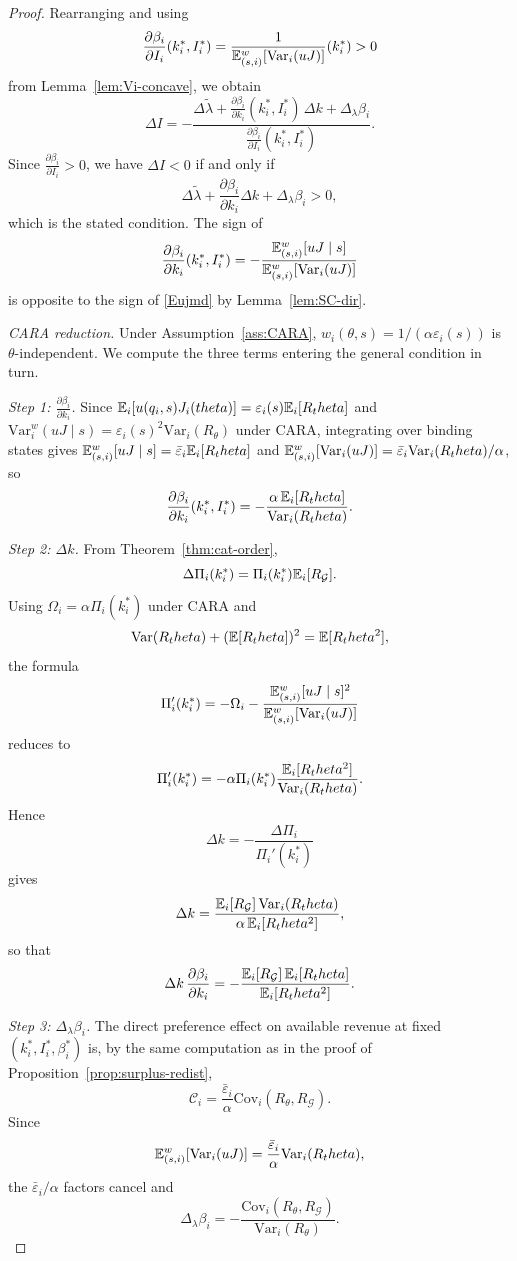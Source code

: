 \documentclass[master.tex]{subfiles}
\begin{document}
\begin{proof}
Rearranging and using
\[
\frac{\partial\beta_i}{\partial I_i}(k_i^\ast,I_i^\ast)
=
\frac{1}{\mathbb{E}_{(s,i)}^w[\mathrm{Var}_i(uJ)]}(k_i^\ast)>0
\]
from Lemma~\ref{lem:Vi-concave}, we obtain
\[
\Delta I
=
-\frac{
\Delta\tilde\lambda
+
\frac{\partial \beta_i}{\partial k_i}(k_i^\ast,I_i^\ast)\,\Delta k
+
\Delta_\lambda\beta_i
}{
\frac{\partial \beta_i}{\partial I_i}(k_i^\ast,I_i^\ast)
}.
\]
Since $\frac{\partial\beta_i}{\partial I_i}>0$, we have $\Delta I<0$ if and only if
\[
\Delta\tilde\lambda
+
\frac{\partial\beta_i}{\partial k_i}\Delta k
+
\Delta_\lambda\beta_i
>0,
\]
which is the stated condition. The sign of
\[
\frac{\partial\beta_i}{\partial k_i}(k_i^\ast,I_i^\ast)
=
-\frac{\mathbb{E}_{(s,i)}^w[uJ\mid s]}{\mathbb{E}_{(s,i)}^w[\mathrm{Var}_i(uJ)]}
\]
is opposite to the sign of \eqref{Eujmd} by Lemma~\ref{lem:SC-dir}.

\noindent\textit{CARA reduction.} Under Assumption~\ref{ass:CARA}, $w_i(\theta,s)=1/(\alpha\varepsilon_i(s))$ is $\theta$-independent. We compute the three terms entering the general condition in turn.

\noindent\textit{Step 1: $\frac{\partial\beta_i}{\partial k_i}$.} Since $\mathbb{E}_i[u(q_i,s)J_i(theta)]=\varepsilon_i(s)\mathbb{E}_i[R_theta]$ and $\mathrm{Var}_i^w(uJ\mid s)=\varepsilon_i(s)^2\mathrm{Var}_i(R_\theta)$ under CARA, integrating over binding states gives $\mathbb{E}_{(s,i)}^w[uJ\mid s]=\bar\varepsilon_i\mathbb{E}_i[R_theta]$ and $\mathbb{E}_{(s,i)}^w[\mathrm{Var}_i(uJ)]=\bar\varepsilon_i\mathrm{Var}_i(R_theta)/\alpha$, so
\[
\frac{\partial\beta_i}{\partial k_i}(k_i^\ast,I_i^\ast)
=
-\frac{\alpha\,\mathbb{E}_i[R_theta]}{\mathrm{Var}_i(R_theta)}.
\]

\noindent\textit{Step 2: $\Delta k$.} From Theorem~\ref{thm:cat-order},
\[
\Delta\Pi_i(k_i^\ast)=\Pi_i(k_i^\ast)\mathbb{E}_i[R_\mathcal{G}].
\]
Using $\Omega_i=\alpha\Pi_i(k_i^\ast)$ under CARA and
\[
\mathrm{Var}(R_theta)+(\mathbb{E}[R_theta])^2=\mathbb{E}[R_theta^2],
\]
the formula
\[
\Pi_i'(k_i^\ast)
=
-\Omega_i-\frac{\mathbb{E}_{(s,i)}^w[uJ\mid s]^2}{\mathbb{E}_{(s,i)}^w[\mathrm{Var}_i(uJ)]}
\]
reduces to
\[
\Pi_i'(k_i^\ast)
=
-\alpha\Pi_i(k_i^\ast)\frac{\mathbb{E}_i[R_theta^2]}{\mathrm{Var}_i(R_theta)}.
\]
Hence
\[
\Delta k = -\frac{\Delta\Pi_i}{\Pi_i'(k_i^\ast)}
\]
gives
\[
\Delta k
=
\frac{\mathbb{E}_i[R_\mathcal{G}]\,\mathrm{Var}_i(R_theta)}{\alpha\,\mathbb{E}_i[R_theta^2]},
\]
so that
\[
\Delta k\,\frac{\partial\beta_i}{\partial k_i}
=
-\frac{\mathbb{E}_i[R_\mathcal{G}]\,\mathbb{E}_i[R_theta]}{\mathbb{E}_i[R_theta^2]}.
\]

\noindent\textit{Step 3: $\Delta_\lambda\beta_i$.} The direct preference effect on available revenue at fixed $(k_i^\ast,I_i^\ast,\beta_i^\ast)$ is, by the same computation as in the proof of Proposition~\ref{prop:surplus-redist},
\[
\mathcal C_i
=
\frac{\bar\varepsilon_i}{\alpha}\mathrm{Cov}_i(R_\theta,R_\mathcal{G}).
\]
Since
\[
\mathbb{E}_{(s,i)}^w[\mathrm{Var}_i(uJ)]
=
\frac{\bar\varepsilon_i}{\alpha}\mathrm{Var}_i(R_theta),
\]
the $\bar\varepsilon_i/\alpha$ factors cancel and
\[
\Delta_\lambda\beta_i
=
-\frac{\mathrm{Cov}_i(R_\theta,R_\mathcal{G})}{\mathrm{Var}_i(R_\theta)}.
\]


\end{proof}
\end{document}
